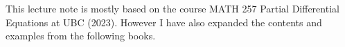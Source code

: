 \documentclass[12pt]{article}
\begin{document}

This lecture note is mostly based on the course MATH 257 Partial Differential Equations at UBC (2023). However I have also expanded the contents and examples from the following books.

\newpage


\end{document}

